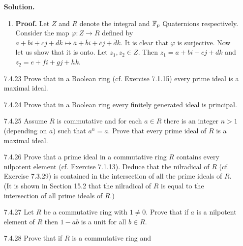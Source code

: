 \begin{enumerate}
      \textbf{Solution.}
      
      \begin{enumerate}
         \item \textbf{Proof.} Let $Z$ and $R$ denote the integral and $\mathbb{F}_p$
               Quaternions respectively. Consider the map
               $\varphi : Z \rightarrow R$ defined by
               $a + bi + cj + dk \mapsto \overline{a} + \overline{b}i +
                \overline{c}j +\overline{d}k$. It is clear that $\varphi$ is
                surjective. Now let us show that it is onto. Let
                $z_1, z_2 \in Z$. Then $z_1 = a + bi + cj + dk$ and
                $z_2 = e + fi + gj + hk$. 
      \end{enumerate}
   \item[7.4.23]  Prove that in a Boolean ring (cf. Exercise 7.1.15) every prime
                  ideal is a maximal ideal.
   \item[7.4.24]  Prove that in a Boolean ring every finitely generated ideal is
                  principal.
   \item[7.4.25]  Assume $R$ is commutative and for each $a \in R$ there is an
                  integer $n > 1$ (depending on $a$) such that $a^n = a$. Prove
                  that every prime ideal of $R$ is a maximal ideal.
   \item[7.4.26]  Prove that a prime ideal in a commutative ring $R$ contains
                  every nilpotent element (cf. Exercise 7.1.13). Deduce that the
                  nilradical of $R$ (cf. Exercise 7.3.29) is contained in the
                  intersection of all the prime ideals of $R$. (It is shown in
                  Section 15.2 that the nilradical of $R$ is equal to the
                  intersection of all prime ideals of $R$.)
   \item[7.4.27]  Let $R$ be a commutative ring with $1 \neq 0$. Prove that if
                  $a$ is a nilpotent element of $R$ then $1 - ab$ is a unit for
                  all $b \in R$.
   \item[7.4.28]  Prove that if $R$ is a commutative ring and

\end{enumerate}
